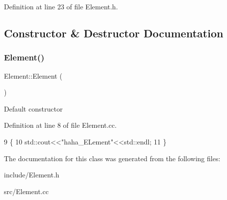 Definition at line 23 of file Element.\+h.



\subsection{Constructor \& Destructor Documentation}
\mbox{\label{class_element_ab0d0e20be9a36ae676202db753faeec9}} 
\subsubsection{\texorpdfstring{Element()}{Element()}}
{\footnotesize\ttfamily Element\+::\+Element (\begin{DoxyParamCaption}{ }\end{DoxyParamCaption})}

Default constructor 

Definition at line 8 of file Element.\+cc.


\begin{DoxyCode}
9 \{
10     std::cout<<\textcolor{stringliteral}{"haha\_ELement"}<<std::endl;
11 \}
\end{DoxyCode}


The documentation for this class was generated from the following files\+:\begin{DoxyCompactItemize}
\item 
include/Element.\+h\item 
src/Element.\+cc\end{DoxyCompactItemize}
